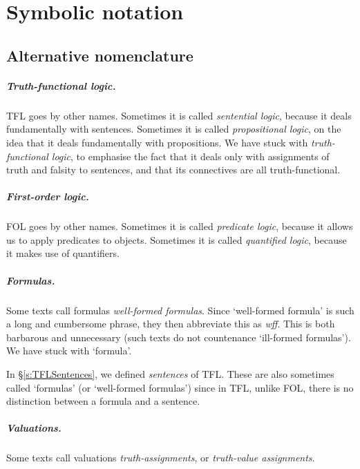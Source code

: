 
\chapter{Symbolic notation}
\label{app.notation}

\section{Alternative nomenclature}

\paragraph{Truth-functional logic.} TFL goes by other names. Sometimes it is called \emph{sentential logic}, because it deals fundamentally with sentences. Sometimes it is called \emph{propositional logic}, on the idea that it deals fundamentally with propositions. We have stuck with \emph{truth-functional logic}, to emphasise the fact that it deals only with assignments of truth and falsity to sentences, and that its connectives are all truth-functional.

\paragraph{First-order logic.} FOL goes by other names. Sometimes it is called \emph{predicate logic}, because it allows us to apply  predicates to objects. Sometimes it is called \emph{quantified logic}, because it makes use of quantifiers.

\paragraph{Formulas.} Some texts call formulas \emph{well-formed formulas}. Since `well-formed formula' is such a long and cumbersome phrase, they then abbreviate this as \emph{wff}. This is both barbarous and unnecessary (such texts do not countenance `ill-formed formulas'). We have stuck with `formula'. 

In \S\ref{s:TFLSentences}, we defined \emph{sentences} of TFL. These are also sometimes called `formulas' (or `well-formed formulas') since in TFL, unlike FOL, there is no distinction between a formula and a sentence.

\paragraph{Valuations.} Some texts call valuations \emph{truth-assignments}, or \emph{truth-value assignments}.

